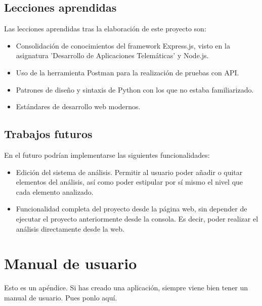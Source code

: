\documentclass[a4paper, 12pt]{book}
\begin{document}
\section{Lecciones aprendidas}
\label{sec:lecciones_aprendidas}

Las lecciones aprendidas tras la elaboración de este proyecto son:

\begin{itemize}
    \item Consolidación de conocimientos del framework Express.js, visto en la asignatura 'Desarrollo de Aplicaciones Telemáticas' y Node.js.
    \item Uso de la herramienta Postman para la realización de pruebas con API.
    \item Patrones de diseño y sintaxis de Python con los que no estaba familiarizado.
    \item Estándares de desarrollo web modernos.
\end{itemize}

\section{Trabajos futuros}
\label{sec:trabajos_futuros}

En el futuro podrían implementarse las siguientes funcionalidades:

\begin{itemize}
    \item Edición del sistema de análisis. Permitir al usuario poder añadir o quitar elementos del análisis, así como poder estipular por sí mismo el nivel que cada elemento analizado.
    \item Funcionalidad completa del proyecto desde la página web, sin depender de ejecutar el proyecto anteriormente desde la consola. Es decir, poder realizar el análisis directamente desde la web.
\end{itemize}



\cleardoublepage
\appendix
\chapter{Manual de usuario}
\label{app:manual}

Esto es un apéndice.
Si has creado una aplicación, siempre viene bien tener un manual de usuario.
Pues ponlo aquí.
\end{document}

